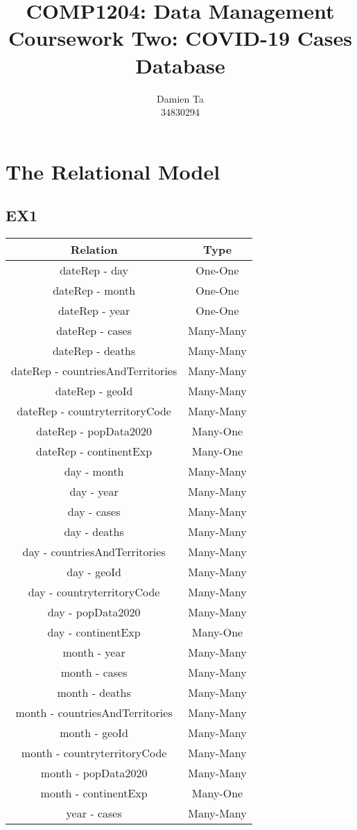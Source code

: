 \documentclass[]{article}
\title{COMP1204: Data Management \\ Coursework Two: COVID-19 Cases Database }
\author{Damien Ta \\ 34830294}
\begin{document}
\maketitle

\section{The Relational Model}

\subsection{EX1}

\begin{tabular}{ |c|c| }
\hline
\textbf{Relation} & \textbf{Type} \\
\hline
dateRep - day & One-One\\
dateRep - month & One-One\\
dateRep - year & One-One\\
dateRep - cases & Many-Many\\
dateRep - deaths & Many-Many\\
dateRep - countriesAndTerritories & Many-Many\\
dateRep - geoId & Many-Many\\
dateRep - countryterritoryCode & Many-Many\\
dateRep - popData2020 & Many-One\\
dateRep - continentExp & Many-One\\
day - month & Many-Many\\
day - year & Many-Many\\
day - cases & Many-Many\\
day - deaths & Many-Many\\
day - countriesAndTerritories & Many-Many\\
day - geoId & Many-Many\\
day - countryterritoryCode & Many-Many\\
day - popData2020 & Many-Many\\
day - continentExp & Many-One\\
month - year & Many-Many\\
month - cases & Many-Many\\
month - deaths & Many-Many\\
month - countriesAndTerritories & Many-Many\\
month - geoId & Many-Many\\
month - countryterritoryCode & Many-Many\\
month - popData2020 & Many-Many\\
month - continentExp & Many-One\\
year - cases & Many-Many\\
\hline
\end{tabular}
\end{document}
